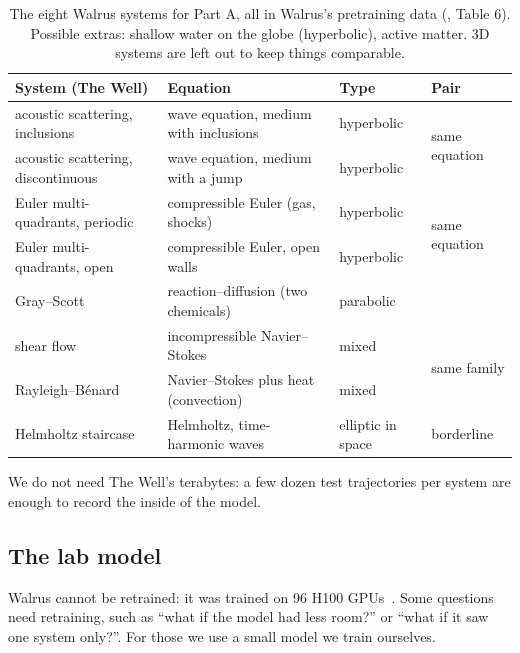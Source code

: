 \documentclass[11pt,a4paper]{article}
\begin{document}
\begin{table}[htbp]
\centering
\renewcommand{\arraystretch}{1.5}
\small
\begin{tabularx}{\textwidth}{>{\raggedright\arraybackslash}p{4.3cm} >{\raggedright\arraybackslash}X l l}
\toprule
\textbf{System (The Well)} & \textbf{Equation} & \textbf{Type} & \textbf{Pair} \\
\midrule
acoustic scattering, inclusions & wave equation, medium with inclusions & hyperbolic & \multirow{2}{*}{same equation} \\
acoustic scattering, discontinuous & wave equation, medium with a jump & hyperbolic & \\
Euler multi-quadrants, periodic & compressible Euler (gas, shocks) & hyperbolic & \multirow{2}{*}{same equation} \\
Euler multi-quadrants, open & compressible Euler, open walls & hyperbolic & \\
Gray--Scott & reaction--diffusion (two chemicals) & parabolic & \\
shear flow & incompressible Navier--Stokes & mixed & \multirow{2}{*}{same family} \\
Rayleigh--B\'enard & Navier--Stokes plus heat (convection) & mixed & \\
Helmholtz staircase & Helmholtz, time-harmonic waves & elliptic in space & borderline \\
\bottomrule
\end{tabularx}
\caption{The eight Walrus systems for Part A, all in Walrus's pretraining data (\cite{walrus}, Table 6).
Possible extras: shallow water on the globe (hyperbolic), active matter. 3D systems are left out to keep things comparable.}
\label{tab:systems}
\end{table}

We do not need The Well's terabytes: a few dozen test trajectories per system are enough to record the inside of the model.

\subsection{The lab model}

Walrus cannot be retrained: it was trained on 96 H100 GPUs~\cite{walrus}. Some questions need retraining, such as
``what if the model had less room?'' or ``what if it saw one system only?''. For those we use a small model we train ourselves.
\end{document}

